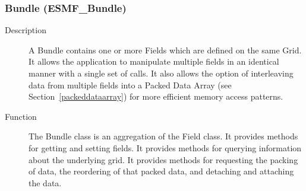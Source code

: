 

\subsubsection{Bundle (ESMF\_Bundle)}
\label{sec:bundle} 
\begin{description}
\item [Description] A Bundle contains one or more Fields which are defined on the
same Grid.  It allows the application to manipulate multiple fields in an identical
manner with a single set of calls.  It also allows the option of interleaving data
from multiple fields into a Packed Data Array (see Section~\ref{packeddataarray}) for
more efficient memory access patterns.
\item [Function] The Bundle class is an aggregation of the Field class.  It provides methods 
for getting and setting fields.  It provides methods for querying information about the
underlying grid.  It provides methods for requesting the packing of data, the
reordering of that packed data, and detaching and attaching the data.
\end{description}

